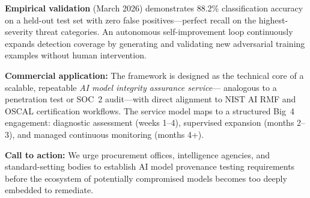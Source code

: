 \documentclass[11pt]{article}
\begin{document}
\textbf{Empirical validation} (March 2026) demonstrates 88.2\% classification
accuracy on a held-out test set with zero false positives---perfect recall on
the highest-severity threat categories. An autonomous self-improvement loop
continuously expands detection coverage by generating and validating new
adversarial training examples without human intervention.

\textbf{Commercial application:} The framework is designed as the technical
core of a scalable, repeatable \emph{AI model integrity assurance service}---
analogous to a penetration test or SOC~2 audit---with direct alignment to
NIST AI RMF and OSCAL certification workflows. The service model maps to a
structured Big~4 engagement: diagnostic assessment (weeks 1--4), supervised
expansion (months 2--3), and managed continuous monitoring (months 4+).

\textbf{Call to action:} We urge procurement offices, intelligence agencies,
and standard-setting bodies to establish AI model provenance testing requirements
before the ecosystem of potentially compromised models becomes too deeply
embedded to remediate.

\newpage
\end{document}
